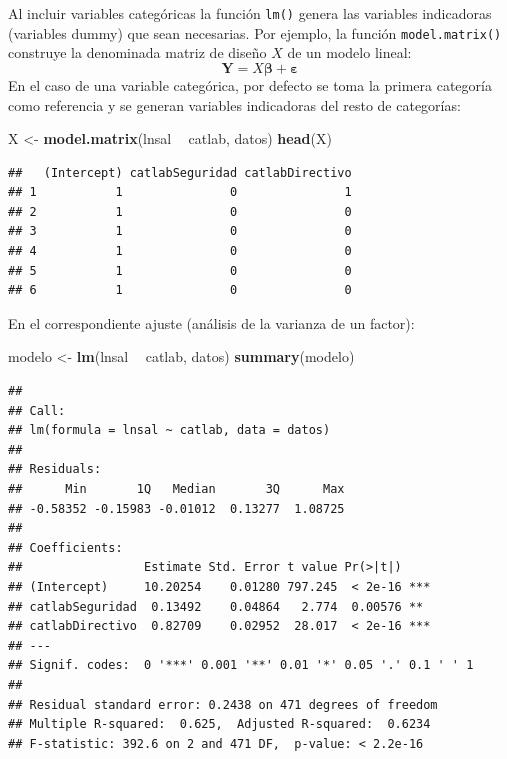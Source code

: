 \documentclass[]{book}
\newenvironment{Shaded}{\begin{snugshade}}{\end{snugshade}}
\newcommand{\KeywordTok}[1]{\textcolor[rgb]{0.13,0.29,0.53}{\textbf{#1}}}
\newcommand{\StringTok}[1]{\textcolor[rgb]{0.31,0.60,0.02}{#1}}
\newcommand{\OperatorTok}[1]{\textcolor[rgb]{0.81,0.36,0.00}{\textbf{#1}}}
\newcommand{\NormalTok}[1]{#1}
\begin{document}
Al incluir variables categóricas la función \texttt{lm()} genera las
variables indicadoras (variables dummy) que sean necesarias. Por
ejemplo, la función \texttt{model.matrix()} construye la denominada
matriz de diseño \(X\) de un modelo lineal:
\[\mathbf{Y}=X\mathbf{\beta}+\mathbf{\varepsilon}\] En el caso de una
variable categórica, por defecto se toma la primera categoría como
referencia y se generan variables indicadoras del resto de categorías:

\begin{Shaded}
\begin{Highlighting}[]
\NormalTok{X <-}\StringTok{ }\KeywordTok{model.matrix}\NormalTok{(lnsal }\OperatorTok{~}\StringTok{ }\NormalTok{catlab, datos)}
\KeywordTok{head}\NormalTok{(X)}
\end{Highlighting}
\end{Shaded}

\begin{verbatim}
##   (Intercept) catlabSeguridad catlabDirectivo
## 1           1               0               1
## 2           1               0               0
## 3           1               0               0
## 4           1               0               0
## 5           1               0               0
## 6           1               0               0
\end{verbatim}

En el correspondiente ajuste (análisis de la varianza de un factor):

\begin{Shaded}
\begin{Highlighting}[]
\NormalTok{modelo <-}\StringTok{ }\KeywordTok{lm}\NormalTok{(lnsal }\OperatorTok{~}\StringTok{ }\NormalTok{catlab, datos)}
\KeywordTok{summary}\NormalTok{(modelo)}
\end{Highlighting}
\end{Shaded}

\begin{verbatim}
## 
## Call:
## lm(formula = lnsal ~ catlab, data = datos)
## 
## Residuals:
##      Min       1Q   Median       3Q      Max 
## -0.58352 -0.15983 -0.01012  0.13277  1.08725 
## 
## Coefficients:
##                 Estimate Std. Error t value Pr(>|t|)    
## (Intercept)     10.20254    0.01280 797.245  < 2e-16 ***
## catlabSeguridad  0.13492    0.04864   2.774  0.00576 ** 
## catlabDirectivo  0.82709    0.02952  28.017  < 2e-16 ***
## ---
## Signif. codes:  0 '***' 0.001 '**' 0.01 '*' 0.05 '.' 0.1 ' ' 1
## 
## Residual standard error: 0.2438 on 471 degrees of freedom
## Multiple R-squared:  0.625,  Adjusted R-squared:  0.6234 
## F-statistic: 392.6 on 2 and 471 DF,  p-value: < 2.2e-16
\end{verbatim}
\end{document}
